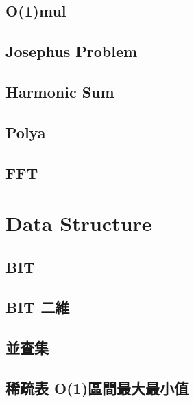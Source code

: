 \subsection{O(1)mul}


\subsection{Josephus Problem}


\subsection{Harmonic Sum}


\subsection{Polya}


\subsection{FFT}


\section{Data Structure}

\subsection{BIT}


\subsection{BIT 二維}


\subsection{並查集}


\subsection{稀疏表 O(1)區間最大最小值}


